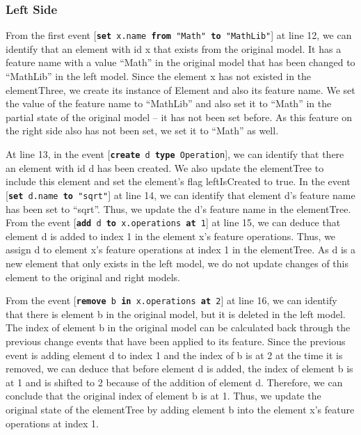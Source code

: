\documentclass{jot}
\begin{document}
\subsubsection{Left Side}\label{sec:left_side}

From the first event [\texttt{\small \textbf{set} x.name \textbf{from} "Math" \textbf{to} "MathLib"}] at line 12, we can identify that an element with id \textsf{x} that exists from the original model. It has a feature \textsf{name} with a value ``Math'' in the original model that has been changed to ``MathLib'' in the left model. Since the element \textsf{x} has not existed in the \textsf{elementThree}, we create its instance of \textsf{Element} and also its feature \textsf{name}. We set the value of the feature \textsf{name} to ``MathLib'' and also set it to ``Math'' in the partial state of the original model -- it has not been set before. As this feature on the right side also has not been set, we set it to ``Math'' as well. 

At line 13, in the event [\texttt{\small \textbf{create} d \textbf{type} Operation}], we can identify that there an element with id \textsf{d} has been created. We also update the \textsf{elementTree} to include this element and set the element's flag \textsf{leftIsCreated} to \textsf{true}. In the event [\texttt{\small \textbf{set} d.name \textbf{to} "sqrt"}] at line 14, we can identify that element \textsf{d}'s feature \textsf{name} has been set to ``sqrt''. Thus, we update the \textsf{d}'s feature \textsf{name} in the \textsf{elementTree}. From the event [\texttt{\small \textbf{add} d \textbf{to} x.operations \textbf{at} 1}] at line 15, we can deduce that element \textsf{d} is added to index 1 in the element \textsf{x}'s feature \textsf{operations}. Thus, we assign \textsf{d} to element \textsf{x}'s feature \textsf{operations} at index 1 in the \textsf{elementTree}. As \textsf{d} is a new element that only exists in the left model, we do not update changes of this element to the original and right models. 

From the event [\texttt{\small \textbf{remove} b \textbf{in} x.operations \textbf{at} 2}] at line 16, we can identify that there is element \textsf{b} in the original model, but it is deleted in the left model. The index of element \textsf{b} in the original model can be calculated back through the previous change events that have been applied to its feature. Since the previous event is adding element \textsf{d} to index 1 and the index of \textsf{b} is at 2 at the time it is removed, we can deduce that before element \textsf{d} is added, the index of element \textsf{b} is at 1 and is shifted to 2 because of the addition of element \textsf{d}.  Therefore, we can conclude that the original index of element \textsf{b} is at 1. Thus, we update the original state of the \textsf{elementTree} by adding element \textsf{b} into the element \textsf{x}'s feature \textsf{operations} at index 1.  
\end{document}
